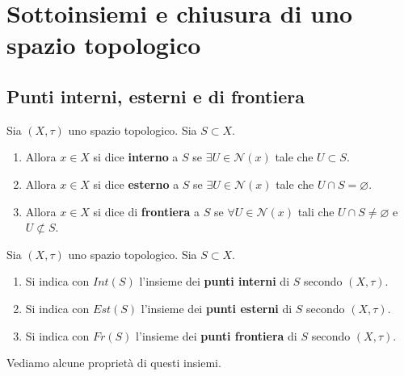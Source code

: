 \section{Sottoinsiemi e chiusura di uno spazio topologico}
\subsection{\textcolor{TopGener}{\textbf{Punti interni, esterni e di frontiera}}}



\begin{definition}
	Sia $(X, \tau)$ uno spazio topologico. Sia $S \subset X$. 
	\begin{enumerate}
		\item Allora $x \in X$ si dice \textbf{interno} a $S$ se $\exists U \in \mathcal{N}(x)$ tale che $U \subset S$.
		\item Allora $x \in X$ si dice \textbf{esterno} a $S$ se $\exists U \in \mathcal{N}(x)$ tale che $U \cap S = \varnothing$.
		\item Allora $x \in X$ si dice di \textbf{frontiera} a $S$ se $\forall U \in \mathcal{N}(x)$ tali che $U \cap S \neq \varnothing$ e $U \not\subset S$.
	\end{enumerate}
\end{definition}

\begin{definition}
	Sia $(X, \tau)$ uno spazio topologico. Sia $S \subset X$. 
	\begin{enumerate}
		\item Si indica con $Int(S)$ l'insieme dei \textbf{punti interni} di $S$ secondo $(X,\tau)$.
		\item Si indica con $Est(S)$ l'insieme dei \textbf{punti esterni} di $S$ secondo $(X,\tau)$.
		\item Si indica con $Fr(S)$ l'insieme dei \textbf{punti frontiera} di $S$ secondo $(X,\tau)$.
	\end{enumerate}
\end{definition}	

Vediamo alcune proprietà di questi insiemi.


